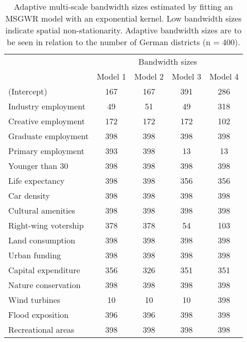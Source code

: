 \begin{table}

\caption[Adaptive multi-scale bandwidth sizes]{\label{tab:msbw}Adaptive multi-scale bandwidth sizes estimated by fitting an MSGWR model with an exponential kernel. Low bandwidth sizes indicate spatial non-stationarity. Adaptive bandwidth sizes are to be seen in relation to the number of German districts (n = 400).}
\centering
\begin{tabular}[t]{lcccc}
\toprule
\multicolumn{1}{c}{ } & \multicolumn{4}{c}{Bandwidth sizes} \\
\cmidrule(l{3pt}r{3pt}){2-5}
 & Model 1 & Model 2 & Model 3 & Model 4\\
\midrule
(Intercept) & 167 & 167 & 391 & 286\\
Industry employment & 49 & 51 & 49 & 318\\
Creative employment & 172 & 172 & 172 & 102\\
Graduate employment & 398 & 398 & 398 & 398\\
Primary employment & 393 & 398 & 13 & 13\\
\addlinespace
Younger than 30 & 398 & 398 & 398 & 398\\
Life expectancy & 398 & 398 & 356 & 356\\
Car density & 398 & 398 & 398 & 398\\
Cultural amenities & 398 & 398 & 398 & 398\\
Right-wing votership & 378 & 378 & 54 & 103\\
\addlinespace
Land consumption & 398 & 398 & 398 & 398\\
Urban funding & 398 & 398 & 398 & 398\\
Capital expenditure & 356 & 326 & 351 & 351\\
Nature conservation & 398 & 398 & 398 & 398\\
Wind turbines & 10 & 10 & 10 & 398\\
\addlinespace
Flood exposition & 396 & 396 & 398 & 398\\
Recreational areas & 398 & 398 & 398 & 398\\
\bottomrule
\end{tabular}
\end{table}